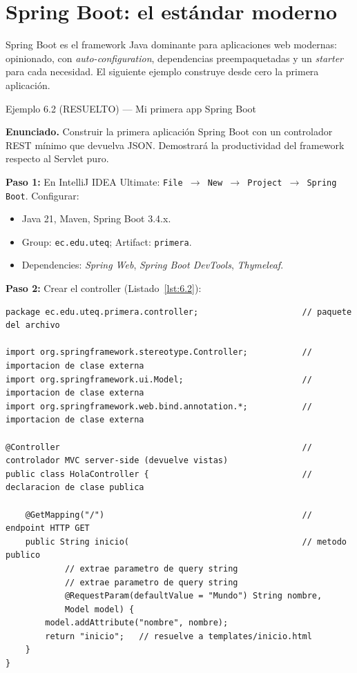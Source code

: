 \documentclass[11pt,a4paper,openany]{book}
\begin{document}
\section{Spring Boot: el estándar moderno}

Spring Boot es el framework Java dominante para aplicaciones
web modernas: opinionado, con \emph{auto-configuration}, dependencias
preempaquetadas y un \emph{starter} para cada necesidad. El
siguiente ejemplo construye desde cero la primera aplicación.


\begin{cajaejemplo}{Ejemplo 6.2 (RESUELTO) --- Mi primera app Spring Boot}


\textbf{Enunciado.} Construir la primera aplicación Spring Boot con un controlador REST mínimo que devuelva JSON. Demostrará la productividad del framework respecto al Servlet puro.

\textbf{Paso 1:} En IntelliJ IDEA Ultimate:
\texttt{File $\rightarrow$ New $\rightarrow$ Project $\rightarrow$
Spring Boot}. Configurar:
\begin{itemize}
\item Java 21, Maven, Spring Boot 3.4.x.
\item Group: \texttt{ec.edu.uteq}; Artifact: \texttt{primera}.
\item Dependencies: \emph{Spring Web}, \emph{Spring Boot DevTools},
\emph{Thymeleaf}.
\end{itemize}

\textbf{Paso 2:} Crear el controller (Listado~\ref{lst:6.2}):

\begin{lstlisting}[style=java,caption={HolaController.java},label=lst:6.2]
package ec.edu.uteq.primera.controller;                     // paquete del archivo

import org.springframework.stereotype.Controller;           // importacion de clase externa
import org.springframework.ui.Model;                        // importacion de clase externa
import org.springframework.web.bind.annotation.*;           // importacion de clase externa

@Controller                                                 // controlador MVC server-side (devuelve vistas)
public class HolaController {                               // declaracion de clase publica

    @GetMapping("/")                                        // endpoint HTTP GET
    public String inicio(                                   // metodo publico
            // extrae parametro de query string
            // extrae parametro de query string
            @RequestParam(defaultValue = "Mundo") String nombre,
            Model model) {
        model.addAttribute("nombre", nombre);
        return "inicio";   // resuelve a templates/inicio.html
    }
}
\end{lstlisting}


\end{cajaejemplo}
\end{document}
